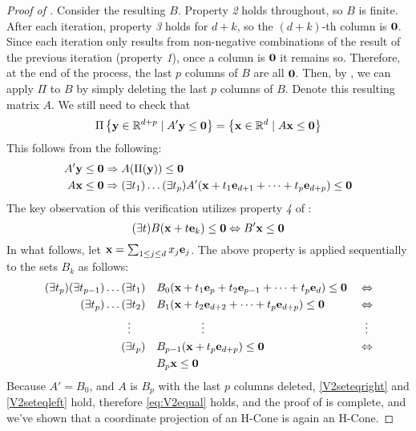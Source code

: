 \begin{proof}[Proof of ]
	Consider the resulting $B$.  Property \textit{2} holds throughout, so $B$ is finite.  After each iteration, property \textit{3} holds for $d+k$, so the $(d+k)$-th column is $\mathbf{0}$.  Since each iteration only results from non-negative combinations of the result of the previous iteration (property \textit{1}), once a column is $\mathbf{0}$ it remains so.  Therefore, at the end of the process, the last $p$ columns of $B$ are all $\mathbf{0}$.  Then, by , we can apply $\Pi$ to $B$ by simply deleting the last $p$ columns of $B$.  Denote this resulting matrix $A$.  We still need to check that
	\begin{equation}\label{eq:V2equal}
		\Pi\left\{\mathbf{y}\in\mathbb{R}^{d+p}\;|\; A'\mathbf{y}\leq\mathbf{0}\right\} = \left\{\mathbf{x}\in\mathbb{R}^{d}\;|\; A\mathbf{x}\leq\mathbf{0}\right\}
	\end{equation}
	This follows from the following:
	\begin{align}
		A'\mathbf{y} & \leq \mathbf{0} \Rightarrow A(\Pi(\mathbf{y})) \leq \mathbf{0} \label{V2seteqright}                                                           \\
		A\mathbf{x}  & \leq \mathbf{0} \Rightarrow (\exists t_1)\dots(\exists t_p) A'(\mathbf{x}+t_1\mathbf{e}_{d+1}+\cdots+t_p\mathbf{e}_{d+p}) \leq \mathbf{0} \label{V2seteqleft}
	\end{align}
	The key observation of this verification utilizes property \textit{4} of :
	\[ (\exists t)B(\mathbf{x} + t\mathbf{e}_k) \leq \mathbf{0} \Leftrightarrow B'\mathbf{x} \leq \mathbf{0} \]
	In what follows, let $\mathbf{x} = \sum_{1 \leq j \leq d}x_j\mathbf{e}_j$.  The above property is applied sequentially to the sets $B_k$ as follows:
	\begin{alignat*}{2}
		(\exists t_p)(\exists t_{p-1})\dots(\exists t_1)                & \quad
		B_0(\mathbf{x} + t_1\mathbf{e}_{p} + t_2\mathbf{e}_{p-1} + \dots + t_p\mathbf{e}_{d}) \leq \mathbf{0}\; & \Leftrightarrow                                                 \\
		(\exists t_p)\dots(\exists t_2)                                 & \quad
		B_1(\mathbf{x} + t_2\mathbf{e}_{d+2} + \dots + t_p\mathbf{e}_{d+p})
		\leq \mathbf{0}                                                         & \Leftrightarrow                                                 \\
		\vdots \hspace{1.3em}                                           & \hspace{5em}\vdots                       & \vdots\hspace{0.4em} \\
		(\exists t_p)                                                   & \quad B_{p-1}(\mathbf{x} + t_p\mathbf{e}_{d+p})  \leq \mathbf{0} & \Leftrightarrow      \\
		                                                                & \quad B_{p}\mathbf{x}  \leq \mathbf{0}                   &
	\end{alignat*}
	Because $A' = B_0$, and $A$ is $B_p$ with the last $p$ columns deleted, \eqref{V2seteqright} and \eqref{V2seteqleft} hold, therefore \eqref{eq:V2equal} holds, and the proof of  is complete, and we've shown that a coordinate projection of an H-Cone is again an H-Cone.
\end{proof}

